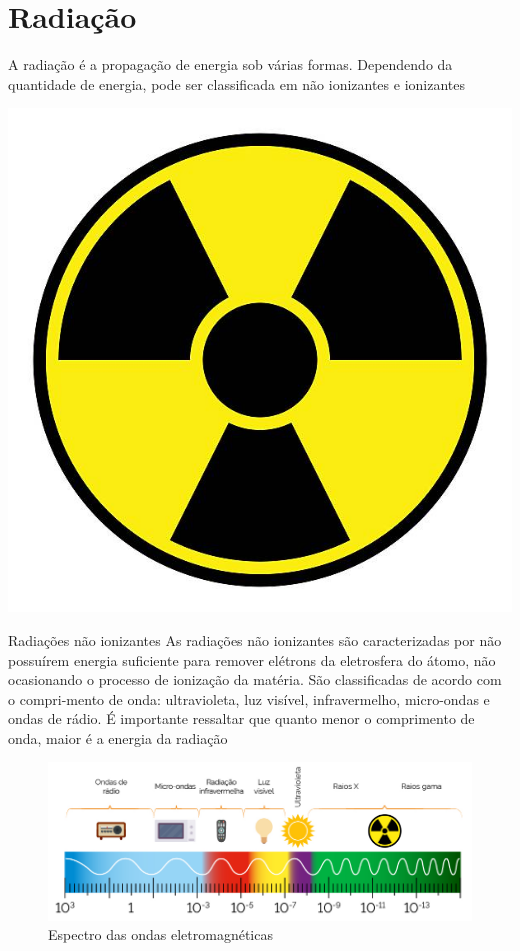 \documentclass[presentation,professionalfonts,aspectratio=169]{beamer}
\begin{document}
\section{Radiação}
\label{sec:org280c46f}
\begin{frame}[label={sec:org0df0967}]{}
A  radiação  é  a  propagação  de  energia  sob  várias  formas.  Dependendo  da  quantidade de energia, pode ser classificada em não ionizantes e ionizantes

\begin{center}
\includegraphics[scale=0.5]{FQ/Radioatividade/RadiacaoSymbol.jpg}
\end{center}
\end{frame}

\begin{frame}[label={sec:org60eb5f6}]{Radiações não ionizantes}
As radiações não ionizantes são caracterizadas por não possuírem energia suficiente para remover elétrons da eletrosfera do átomo, não ocasionando o processo de ionização da matéria. São classificadas de acordo com o compri-mento de onda: ultravioleta, luz visível, infravermelho, micro-ondas e ondas de rádio.  É  importante  ressaltar  que  quanto  menor  o  comprimento  de  onda, maior é a energia da radiação

\begin{figure}[htbp]
\centering
\includegraphics[scale=0.3]{FQ/Radioatividade/espectro.png}
\caption{\label{fig:org1f6003b}Espectro das ondas eletromagnéticas}
\end{figure}
\end{frame}
\end{document}
